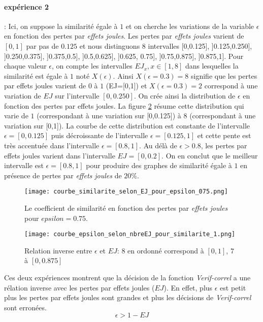 \paragraph{exp\'erience 2} :
Ici, on suppose la similarit\'e \'egale \`a $1$ et on cherche les variations de la variable $\epsilon$ en fonction des pertes par {\em effets joules}. 
Les pertes par {\em effets joules} varient de $[0,1]$ par pas de $0.125$ et nous distinguons $8$ intervalles [0,0.125], ]0.125,0.250], ]0.250,0.375], ]0.375,0.5], ]0.5,0.625], ]0.625, 0.75], ]0.75,0.875], ]0.875,1]. 
Pour chaque valeur $\epsilon$, on compte les intervalles $EJ_x, x \in [1,8]$ dans lesquelles la similarit\'e est \'egale \`a $1$ not\'e $X(\epsilon)$. Ainsi $X(\epsilon=0.3) = 8$ signifie que  les pertes par effets joules varient de $0$ \`a $1$ (EJ=[0,1]) et $X(\epsilon=0.3) = 2$ correspond \`a une variation de $EJ$ sur l'intervalle $[0,0.250]$.
On cr\'ee ainsi la distribution de $\epsilon$ en fonction des pertes par effets joules.
La figure \ref{courbeEpsilonEJ}  r\'esume cette distribution qui varie de $1$ (correspondant \`a une variation sur [0,0.125]) \`a $8$ (correspondant \`a une variation sur [0,1]).
La courbe de cette distribution est constante de l'intervalle $\epsilon = [0,0.125]$ puis  d\'ecroissante de l'intervalle $\epsilon =[0.125,1]$ et cette pente est tr\`es accentu\'ee dans l'intervalle $\epsilon = [0.8, 1]$. 
Au d\'el\`a  de $\epsilon > 0.8$, les pertes par effets joules varient dans l'intervalle $EJ=[0,0.2]$.
On en conclut que le meilleur intervalle est $\epsilon = [0.8, 1]$ pour produire des graphes de similarit\'e \'egale \`a $1$ en pr\'esence de pertes par {\em effets joules} de $20\%$.

\begin{figure}
\centering
\texttt{[image: courbe\_similarite\_selon\_EJ\_pour\_epsilon\_075.png]}
\caption{ Le coefficient de similarit\'e en fonction des pertes par {\em effets joules} pour $epsilon=0.75$.}
\label {courbeEJCoef}
\end{figure}
\begin{figure}
\centering
\texttt{[image: courbe\_epsilon\_selon\_nbreEJ\_pour\_similarite\_1.png]}
\caption{ Relation inverse entre $\epsilon$ et $EJ$: $8$ en ordonn\'e correspond \`a $[0,1]$, $7$ \`a $[0, 0.875]$ }
\label {courbeEpsilonEJ}
\end{figure}

Ces deux exp\'eriences montrent que la d\'ecision de la fonction {\em Verif-correl}  a une r\'elation inverse avec les pertes par effets joules ($EJ$). En effet, plus $\epsilon$ est petit plus les pertes par effets joules sont grandes et plus les d\'ecisions de {\em Verif-correl} sont erron\'ees.
\begin{equation}
	\epsilon > 1 - EJ
\end{equation}
